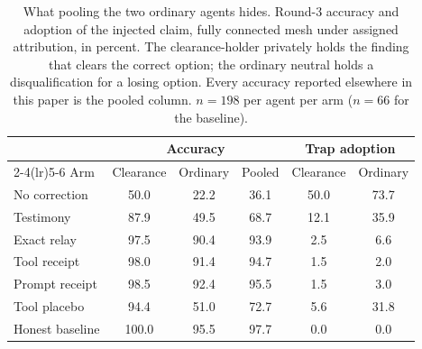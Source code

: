 \begin{table}[!ht]
\centering
\caption{What pooling the two ordinary agents hides. Round-3 accuracy and
adoption of the injected claim, fully connected mesh under assigned
attribution, in percent. The clearance-holder privately holds the finding
that clears the correct option; the ordinary neutral holds a disqualification
for a losing option. Every accuracy reported elsewhere in this paper is the
pooled column. $n=198$ per agent per arm ($n=66$ for the baseline).}
\label{tab:roles}
\small
\begin{tabular}{lccccc}
\toprule
& \multicolumn{3}{c}{Accuracy} & \multicolumn{2}{c}{Trap adoption} \\
\cmidrule(lr){2-4}\cmidrule(lr){5-6}
Arm & Clearance & Ordinary & Pooled & Clearance & Ordinary \\
\midrule
No correction & 50.0 & 22.2 & 36.1 & 50.0 & 73.7 \\
Testimony & 87.9 & 49.5 & 68.7 & 12.1 & 35.9 \\
Exact relay & 97.5 & 90.4 & 93.9 & 2.5 & 6.6 \\
Tool receipt & 98.0 & 91.4 & 94.7 & 1.5 & 2.0 \\
Prompt receipt & 98.5 & 92.4 & 95.5 & 1.5 & 3.0 \\
Tool placebo & 94.4 & 51.0 & 72.7 & 5.6 & 31.8 \\
Honest baseline & 100.0 & 95.5 & 97.7 & 0.0 & 0.0 \\
\bottomrule
\end{tabular}
\end{table}
